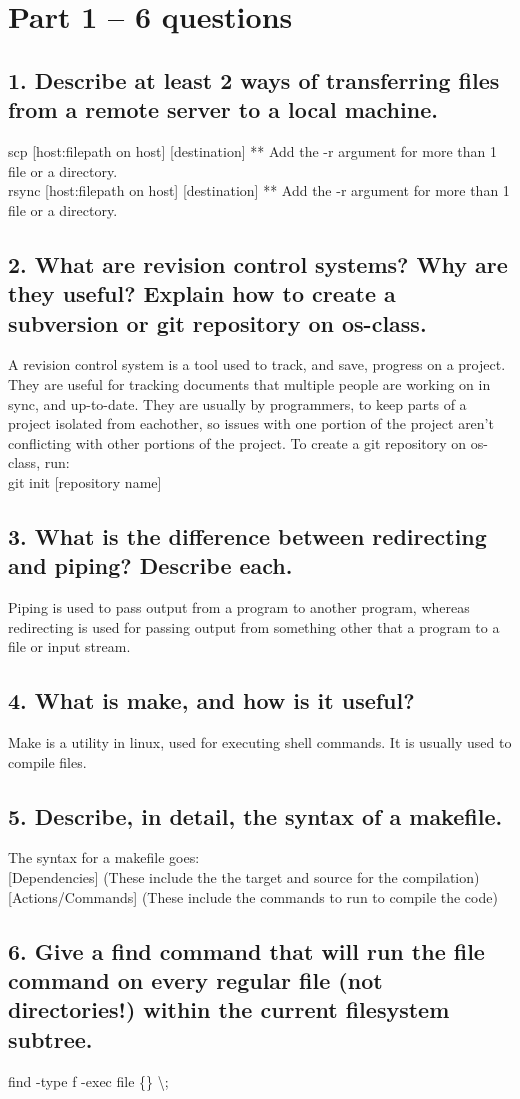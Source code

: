 \documentclass[fleqn,10pt,titlepage]{article}
\numberwithin{equation}{section}
\begin{document}
\section{Part 1 -- 6 questions}
\subsection*{1. Describe at least 2 ways of transferring files from a remote server to a local machine.}

scp {[host:filepath on host]} {[destination]} ** Add the -r argument for more than 1 file or a directory. \\
rsync {[host:filepath on host]} {[destination]} ** Add the -r argument for more than 1 file or a directory.

\subsection*{2. What are revision control systems? Why are they useful? Explain how to create a subversion or git repository on os-class.}

A revision control system is a tool used to track, and save, progress on a project. They are useful for 
tracking documents that multiple people are working on in sync, and up-to-date. They are usually by programmers, to keep parts of a 
project isolated from eachother, so issues with one portion of the project aren't conflicting with other portions of the project. 
To create a git repository on os-class, run: \\
git init {[repository name]}

\subsection*{3. What is the difference between redirecting and piping? Describe each.}
Piping is used to pass output from a program to another program, whereas redirecting is used for passing output from something other%
that a program to a file or input stream.

\subsection*{4. What is make, and how is it useful?}
Make is a utility in linux, used for executing shell commands. It is usually used to compile files.

\subsection*{5. Describe, in detail, the syntax of a makefile.}
The syntax for a makefile goes: \\
{[Dependencies]} (These include the the target and source for the compilation) \\
{[Actions/Commands]} (These include the commands to run to compile the code)

\subsection*{6. Give a find command that will run the file command on every regular file (not directories!) within the current filesystem subtree.}
find -type f -exec file \{\} \textbackslash ;
\end{document}

